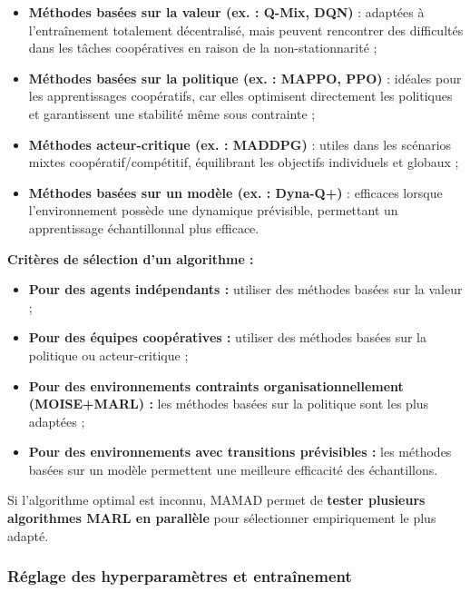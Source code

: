 \documentclass[pdflatex,sn-mathphys-num]{sn-jnl}%
\theoremstyle{thmstyleone}%
\theoremstyle{thmstyletwo}%
\theoremstyle{thmstylethree}%
\begin{document}
\begin{itemize}
    \item \textbf{Méthodes basées sur la valeur (ex. : Q-Mix, DQN)} : adaptées à l'entraînement totalement décentralisé, mais peuvent rencontrer des difficultés dans les tâches coopératives en raison de la non-stationnarité ;
          
    \item \textbf{Méthodes basées sur la politique (ex. : MAPPO, PPO)} : idéales pour les apprentissages coopératifs, car elles optimisent directement les politiques et garantissent une stabilité même sous contrainte ;
          
    \item \textbf{Méthodes acteur-critique (ex. : MADDPG)} : utiles dans les scénarios mixtes coopératif/compétitif, équilibrant les objectifs individuels et globaux ;
          
    \item \textbf{Méthodes basées sur un modèle (ex. : Dyna-Q+)} : efficaces lorsque l'environnement possède une dynamique prévisible, permettant un apprentissage échantillonnal plus efficace.
\end{itemize}

\vspace{0.4em}
\noindent \textbf{Critères de sélection d'un algorithme :}
\begin{itemize}
    \item \textbf{Pour des agents indépendants :} utiliser des méthodes basées sur la valeur ;
    \item \textbf{Pour des équipes coopératives :} utiliser des méthodes basées sur la politique ou acteur-critique ;
    \item \textbf{Pour des environnements contraints organisationnellement (MOISE+MARL) :} les méthodes basées sur la politique sont les plus adaptées ;
    \item \textbf{Pour des environnements avec transitions prévisibles :} les méthodes basées sur un modèle permettent une meilleure efficacité des échantillons.
\end{itemize}

\vspace{0.4em}
\noindent Si l'algorithme optimal est inconnu, MAMAD permet de \textbf{tester plusieurs algorithmes MARL en parallèle} pour sélectionner empiriquement le plus adapté.

\subsubsection{Réglage des hyperparamètres et entraînement}
\end{document}

